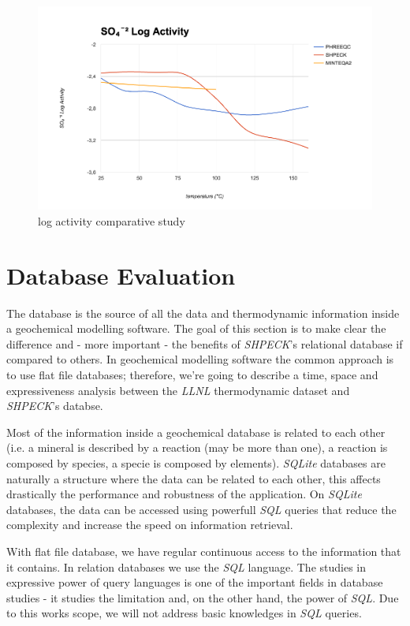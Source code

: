 \begin{figure}[ht!]
\centering
\includegraphics[width=140mm]{figures/so4-2.png}
\caption{ log activity comparative study}
\label{fig:so4-2}
\end{figure}


\section{Database Evaluation}
The database is the source of all the data and thermodynamic information inside a geochemical modelling software. The goal of this section is to make clear the difference and - more important - the benefits of \emph{SHPECK}'s relational database if compared to others. In geochemical modelling software the common approach is to use flat file databases; therefore, we're going to describe a time, space and expressiveness analysis between the \emph{LLNL} thermodynamic dataset and \emph{SHPECK}'s databse. 

Most of the information inside a geochemical database is related to each other (i.e. a mineral is described by a reaction (may be more than one), a reaction is composed by species, a specie is composed by elements). \emph{SQLite} databases are naturally a structure where the data can be related to each other, this affects drastically the performance and robustness of the application. On \emph{SQLite} databases, the data can be accessed using powerfull \emph{SQL} queries that reduce the complexity and increase the speed on information retrieval.

With flat file database, we have regular continuous access to the information that it contains. In relation databases we use the \emph{SQL} language. The studies in expressive power of query languages is one of the important fields in database studies - it studies the limitation and, on the other hand, the power of \emph{SQL}. Due to this works scope, we will not address basic knowledges in \emph{SQL} queries.

